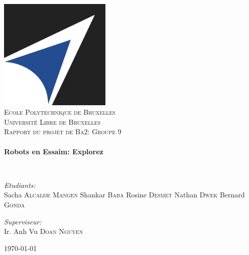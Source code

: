 \begin{titlepage}
\begin{center}

\includegraphics[width=0.4\textwidth]{EPB.jpg}~\\[1cm]

\textsc{\LARGE Ecole Polytechnique de Bruxelles\\Université Libre de Bruxelles}\\[1.5cm]

\textsc{\Large Rapport du projet de Ba2: Groupe 9}\\[0.5cm]

\HRule \\[0.4cm]
{ \huge \bfseries Robots en Essaim: Explorez\\[0.4cm] }

\HRule \\[1.5cm]

\begin{minipage}{0.4\textwidth}
\begin{flushleft} \large
\emph{Etudiants:}\\
Sacha \textsc{Alcalde Mangen}
Shankar \textsc{Baba}
Rosine \textsc{Desmet}
Nathan \textsc{Dwek}
Bernard \textsc{Gonda}
\end{flushleft}
\end{minipage}
\begin{minipage}{0.4\textwidth}
\begin{flushright} \large
\emph{Superviseur:} \\
Ir. Anh Vu \textsc{Doan Nguyen}
\end{flushright}
\end{minipage}

\vfill

{\large \today}

\end{center}
\end{titlepage}